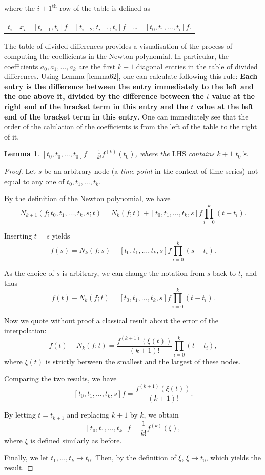 \documentclass[a4paper,11pt,titlepage]{article}
\theoremstyle{definition}
\theoremstyle{plain}
\newtheorem{lemma}[theorem]{Lemma}
\theoremstyle{remark}
\begin{document}
where the $i+1^{\mathrm{th}}$ row of the table is defined as 

\begin{center}
\begin{tabular}{ c c c c c c }
$t_i$ & $x_i$ & $[t_{i-1},t_i]f$ & $[t_{i-2},t_{i-1},t_i]f$ & \dots & $[t_0,t_1,\dots,t_i]f.$
\end{tabular}
\end{center}

The table of divided differences provides a visualisation of the process of computing the coefficients in the Newton polynomial. In particular, the coefficients $a_0,a_1,\dots,a_k$ are the first $k+1$ diagonal entries in the table of divided differences. Using Lemma \ref{lemma62}, one can calculate following this rule: \textbf{Each entry is the difference between the entry immediately to the left and the one above it, divided by the difference between the $t$ value at the right end of the bracket term in this entry and the $t$ value at the left end of the bracket term in this entry}. One can immediately see that the order of the calulation of the coefficients is from the left of the table to the right of it.

\begin{lemma}\label{lemma63}
    $[t_0,t_0,\dots,t_0]f=\frac{1}{k!}f^{(k)}(t_0)$, where the $\mathrm{LHS}$ contains $k+1$ $t_0$'s.
\end{lemma}
\begin{proof}
    Let $s$ be an arbitrary node (a \textit{time point} in the context of time series) not equal to any one of $t_0,t_1,\dots,t_k$.
    
    By the definition of the Newton polynomial, we have
    $$N_{k+1}(f;t_0,t_1,\dots,t_k,s;t)=N_k(f;t)+[t_0,t_1,\dots,t_k,s]f\prod_{i=0}^k(t-t_i).$$
    
    Inserting $t=s$ yields
    $$f(s)=N_k(f;s)+[t_0,t_1,\dots,t_k,s]f\prod_{i=0}^k(s-t_i).$$

    As the choice of $s$ is arbitrary, we can change the notation from $s$ back to $t$, and thus
    $$f(t)-N_k(f;t)=[t_0,t_1,\dots,t_k,s]f\prod_{i=0}^k(t-t_i).$$

    Now we quote without proof a classical result about the error of the interpolation:
    $$f(t)-N_k(f;t)=\frac{f^{(k+1)}(\xi(t))}{(k+1)!}\prod_{i=0}^k(t-t_i),$$
    where $\xi(t)$ is strictly between the smallest and the largest of these nodes.

    Comparing the two results, we have
    $$[t_0,t_1,\dots,t_k,s]f=\frac{f^{(k+1)}(\xi(t))}{(k+1)!}.$$
    
    By letting $t=t_{k+1}$ and replacing $k+1$ by $k$, we obtain
    $$[t_0,t_1,\dots,t_k]f=\frac{1}{k!}f^{(k)}(\xi),$$
    where $\xi$ is defined similarly as before.

    Finally, we let $t_1,\dots,t_k\rightarrow t_0$. Then, by the definition of $\xi$, $\xi\rightarrow t_0$, which yields the result.\cite{Gautschi2012}
\end{proof}
\end{document}
